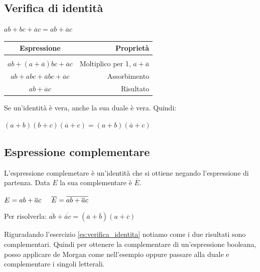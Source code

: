 \subsection*{Verifica di identità}
\begin{exercise}\label{es:verifica_identita}
    $ab+bc+\overline{a}c=ab+\overline{a}c$
    \begin{center}
    \begin{tabular}{c r}
        Espressione & Proprietà\\\hline\\
        $ab+(a+\overline{a})bc+\overline{a}c$ & Moltiplico per 1, $a+\overline{a}$\\
        $ab+abc+\overline{a}bc+\overline{a}c$ & Assorbimento\\
        $ab+\overline{a}c$ & Risultato
    \end{tabular}
    \end{center}
\end{exercise}
Se un'identità è vera, anche la sua duale è vera. Quindi:
\begin{center}
    $(a+b)(b+c)(\overline{a}+c)=(a+b)(\overline{a}+c)$
\end{center}

\subsection{Espressione complementare}
L'espressione complemetare è un'identità che si ottiene negando l'espressione di partenza. Data $E$ la sua complementare è $\overline{E}$.
\begin{center}
    $E=ab+\overline{a}c\hspace{0,5cm}\overline{E}=\overline{ab+\overline{a}c}$
\end{center}
Per risolverla: $\overline{ab}+\overline{\overline{a}c}=(\overline{a}+\overline{b})(a+\overline{c})$

Riguradando l'esercizio \ref{es:verifica_identita} notiamo come i due risultati sono complementari.
Quindi per ottenere la complementare di un'espressione booleana, posso applicare de Morgan come nell'esempio oppure passare alla duale e complementare i singoli letterali.


